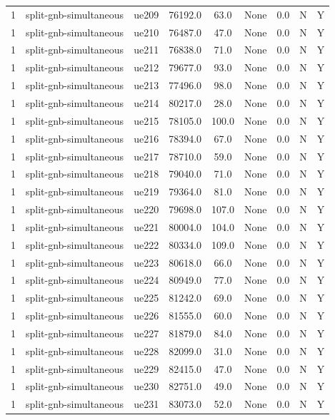\begin{table}[ht]
\begin{tabular}{|c|c|c|c|c|c|c|c|c|}
1 & split-gnb-simultaneous & ue209 & 76192.0 & 63.0 & None & 0.0 & N & Y \\
1 & split-gnb-simultaneous & ue210 & 76487.0 & 47.0 & None & 0.0 & N & Y \\
1 & split-gnb-simultaneous & ue211 & 76838.0 & 71.0 & None & 0.0 & N & Y \\
1 & split-gnb-simultaneous & ue212 & 79677.0 & 93.0 & None & 0.0 & N & Y \\
1 & split-gnb-simultaneous & ue213 & 77496.0 & 98.0 & None & 0.0 & N & Y \\
1 & split-gnb-simultaneous & ue214 & 80217.0 & 28.0 & None & 0.0 & N & Y \\
1 & split-gnb-simultaneous & ue215 & 78105.0 & 100.0 & None & 0.0 & N & Y \\
1 & split-gnb-simultaneous & ue216 & 78394.0 & 67.0 & None & 0.0 & N & Y \\
1 & split-gnb-simultaneous & ue217 & 78710.0 & 59.0 & None & 0.0 & N & Y \\
1 & split-gnb-simultaneous & ue218 & 79040.0 & 71.0 & None & 0.0 & N & Y \\
1 & split-gnb-simultaneous & ue219 & 79364.0 & 81.0 & None & 0.0 & N & Y \\
1 & split-gnb-simultaneous & ue220 & 79698.0 & 107.0 & None & 0.0 & N & Y \\
1 & split-gnb-simultaneous & ue221 & 80004.0 & 104.0 & None & 0.0 & N & Y \\
1 & split-gnb-simultaneous & ue222 & 80334.0 & 109.0 & None & 0.0 & N & Y \\
1 & split-gnb-simultaneous & ue223 & 80618.0 & 66.0 & None & 0.0 & N & Y \\
1 & split-gnb-simultaneous & ue224 & 80949.0 & 77.0 & None & 0.0 & N & Y \\
1 & split-gnb-simultaneous & ue225 & 81242.0 & 69.0 & None & 0.0 & N & Y \\
1 & split-gnb-simultaneous & ue226 & 81555.0 & 60.0 & None & 0.0 & N & Y \\
1 & split-gnb-simultaneous & ue227 & 81879.0 & 84.0 & None & 0.0 & N & Y \\
1 & split-gnb-simultaneous & ue228 & 82099.0 & 31.0 & None & 0.0 & N & Y \\
1 & split-gnb-simultaneous & ue229 & 82415.0 & 47.0 & None & 0.0 & N & Y \\
1 & split-gnb-simultaneous & ue230 & 82751.0 & 49.0 & None & 0.0 & N & Y \\
1 & split-gnb-simultaneous & ue231 & 83073.0 & 52.0 & None & 0.0 & N & Y \\

\end{tabular}
\end{table}
